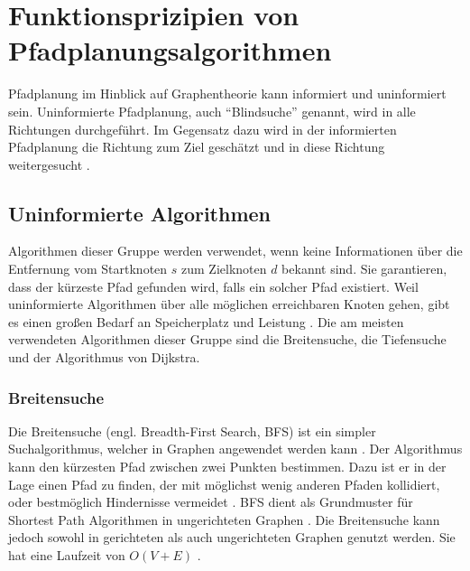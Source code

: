 
\chapter{Funktionsprizipien von Pfadplanungsalgorithmen}

Pfadplanung im Hinblick auf Graphentheorie kann informiert und uninformiert sein. Uninformierte Pfadplanung, auch ``Blindsuche'' genannt, wird in alle Richtungen durchgeführt. Im Gegensatz dazu wird in der informierten Pfadplanung die Richtung zum Ziel geschätzt und in diese Richtung weitergesucht \cite[S.38]{Man18}.

\section{Uninformierte Algorithmen}
Algorithmen dieser Gruppe werden verwendet, wenn keine Informationen über die Entfernung vom Startknoten $s$ zum Zielknoten $d$ bekannt sind. Sie garantieren, dass der kürzeste Pfad gefunden wird, falls ein solcher Pfad existiert. Weil uninformierte Algorithmen über alle möglichen erreichbaren Knoten gehen, gibt es einen großen Bedarf an Speicherplatz und Leistung \cite[S. 232, 235f.]{Noo15}. Die am meisten verwendeten Algorithmen dieser Gruppe sind die Breitensuche, die Tiefensuche und der Algorithmus von Dijkstra.

\subsection{Breitensuche}
\label{sec:bfs}
Die Breitensuche (engl. Breadth-First Search, BFS) ist ein simpler Suchalgorithmus, welcher in Graphen angewendet werden kann \cite[S.594]{Cormen.2009}. Der Algorithmus kann den kürzesten Pfad zwischen zwei Punkten bestimmen. Dazu ist er in der Lage einen Pfad zu finden, der mit möglichst wenig anderen Pfaden kollidiert, oder bestmöglich Hindernisse vermeidet \cite{Lee.1961}. BFS dient als Grundmuster für Shortest Path Algorithmen in ungerichteten Graphen \cite{Ottmann.2017}. Die Breitensuche kann jedoch sowohl in gerichteten als auch ungerichteten Graphen genutzt werden. Sie hat eine Laufzeit von $O(V + E)$ \cite[S.597]{Cormen.2009}.

